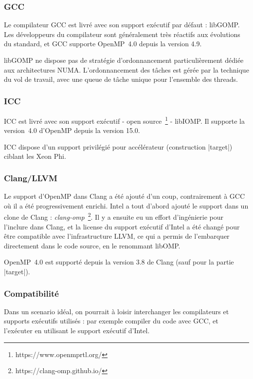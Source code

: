 \subsubsection{GCC}

Le compilateur GCC est livré avec son support exécutif par défaut : libGOMP.
Les développeurs du compilateur sont généralement très réactifs aux évolutions du standard, et GCC supporte OpenMP~4.0 depuis la version 4.9.

libGOMP ne dispose pas de stratégie d'ordonnancement particulièrement dédiée aux architectures NUMA.
L'ordonnancement des tâches est gérée par la technique du vol de travail, avec une queue de tâche unique pour l'ensemble des threads.



\subsubsection{ICC}


ICC est livré avec son support exécutif - open source~\footnote{https://www.openmprtl.org/} - libIOMP.
Il supporte la version~4.0 d'OpenMP depuis la version 15.0.

ICC dispose d'un support privilégié pour accélérateur (construction |target|) ciblant les Xeon Phi.


\subsubsection{Clang/LLVM}

Le support d'OpenMP dans Clang a été ajouté d'un coup, contrairement à GCC où il a été progressivement enrichi.
Intel a tout d'abord ajouté le support dans un clone de Clang : \emph{clang-omp}~\footnote{https://clang-omp.github.io/}.
Il y a ensuite eu un effort d'ingénierie pour l'inclure dans Clang, et la license du support exécutif d'Intel a été changé pour être compatible avec l'infrastructure LLVM, ce qui a permis de l'embarquer directement dans le code source, en le renommant libOMP.

OpenMP~4.0 est supporté depuis la version 3.8 de Clang (sauf pour la partie |target|).

\subsubsection{Compatibilité}

Dans un scenario idéal, on pourrait à loisir interchanger les compilateurs et supports exécutifs utilisés : par exemple compiler du code avec GCC, et l'exécuter en utilisant le support exécutif d'Intel.

